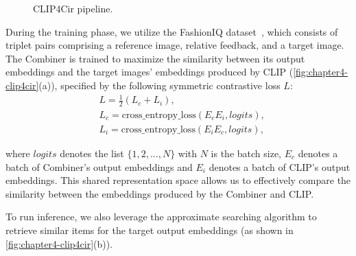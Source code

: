 \begin{figure}[t!]
    \centering
    \hspace{0.5cm}
    \caption{CLIP4Cir pipeline.}
    \label{fig:chapter4-clip4cir}
\end{figure}

During the training phase, we utilize the FashionIQ dataset~\cite{Wu-CVPR2021-FashionIQ}, which consists of triplet pairs comprising a reference image, relative feedback, and a target image. The Combiner is trained to maximize the similarity between its output embeddings and the target images' embeddings produced by CLIP (\autoref{fig:chapter4-clip4cir}(a)), specified by the following symmetric contrastive loss $L$:
\begin{align}
    & L = \frac{1}{2}(L_c + L_i),\\
    & L_c = \text{cross\_entropy\_loss}(E_cE_i, logits),\\
    & L_i = \text{cross\_entropy\_loss}(E_iE_c, logits),
\end{align}

where $logits$ denotes the list $\{1, 2, ..., N\}$ with $N$ is the batch size, $E_c$ denotes a batch of Combiner's output embeddings and $E_i$ denotes a batch of CLIP's output embeddings. This shared representation space allows us to effectively compare the similarity between the embeddings produced by the Combiner and CLIP.

To run inference, we also leverage the approximate searching algorithm to retrieve similar items for the target output embeddings (as shown in \autoref{fig:chapter4-clip4cir}(b)).

